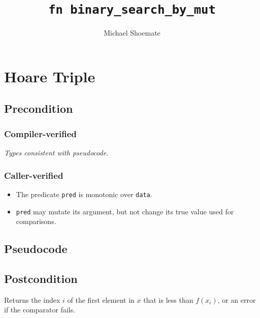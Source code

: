 \documentclass{article}
\title{\texttt{fn binary\_search\_by\_mut}}
\author{Michael Shoemate}
\begin{document}
  
\maketitle 
 
\section{Hoare Triple} 
\subsection*{Precondition} 
\subsubsection*{Compiler-verified}
\textit{Types consistent with pseudocode.}

\subsubsection*{Caller-verified}
\begin{itemize}
    \item The predicate \texttt{pred} is monotonic over \texttt{data}.
    \item \texttt{pred} may mutate its argument, but not change its true value used for comparisons.
\end{itemize}

\subsection*{Pseudocode} 
\label{sec:python-pseudocode} 
 
 
\subsection*{Postcondition} 

\begin{theorem}
    Returns the index $i$ of the first element in $x$ that is less than $f(x_i)$,
    or an error if the comparator fails.
\end{theorem}
\end{document}
